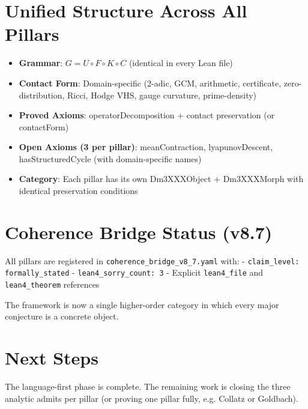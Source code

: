 \documentclass[11pt,a4paper]{article}
\begin{document}
\section{Unified Structure Across All Pillars}

\begin{itemize}
\item \textbf{Grammar}: \(G = U \circ F \circ K \circ C\) (identical in every Lean file)
\item \textbf{Contact Form}: Domain-specific (2-adic, GCM, arithmetic, certificate, zero-distribution, Ricci, Hodge VHS, gauge curvature, prime-density)
\item \textbf{Proved Axioms}: operatorDecomposition + contact preservation (or contactForm)
\item \textbf{Open Axioms (3 per pillar)}: meanContraction, lyapunovDescent, hasStructuredCycle (with domain-specific names)
\item \textbf{Category}: Each pillar has its own Dm3XXXObject + Dm3XXXMorph with identical preservation conditions
\end{itemize}

\section{Coherence Bridge Status (v8.7)}

All pillars are registered in \texttt{coherence\_bridge\_v8\_7.yaml} with:
- \texttt{claim\_level: formally\_stated}
- \texttt{lean4\_sorry\_count: 3}
- Explicit \texttt{lean4\_file} and \texttt{lean4\_theorem} references

The framework is now a single higher-order category in which every major conjecture is a concrete object.

\section{Next Steps}

The language-first phase is complete. The remaining work is closing the three analytic admits per pillar (or proving one pillar fully, e.g. Collatz or Goldbach).
\end{document}

